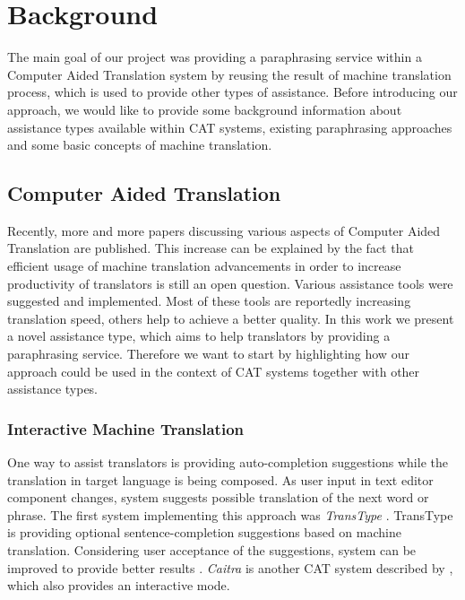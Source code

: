 \chapter{Background}


The main goal of our project was providing a paraphrasing service within a Computer Aided Translation system by reusing the result of machine translation process, which is used to provide other types of assistance. Before introducing our approach, we would like to provide some background information about assistance types available within CAT systems, existing paraphrasing approaches and some basic concepts of machine translation.

\section{Computer Aided Translation}

Recently, more and more papers discussing various aspects of Computer Aided Translation are published. This increase can be explained by the fact that efficient usage of machine translation advancements in order to increase productivity of translators is still an open question. Various assistance tools were suggested and implemented. Most of these tools are reportedly increasing translation speed, others help to achieve a better quality. In this work we present a novel assistance type, which aims to help translators by providing a paraphrasing service. Therefore we want to start by highlighting how our approach could be used in the context of CAT systems together with other assistance types.

\subsection{Interactive Machine Translation}

One way to assist translators is providing auto-completion suggestions while the translation in target language is being composed. As user input in text editor component changes, system suggests possible translation of the next word or phrase. The first system implementing this approach was \emph{TransType} \citep{langlais2000transtype}. TransType is providing optional sentence-completion suggestions based on machine translation. Considering user acceptance of the suggestions, system can be improved to provide better results \citep{barrachina2009statistical}. \emph{Caitra} is another CAT system described by \cite{KoehnHaddow2009}, which also provides an interactive mode. 

